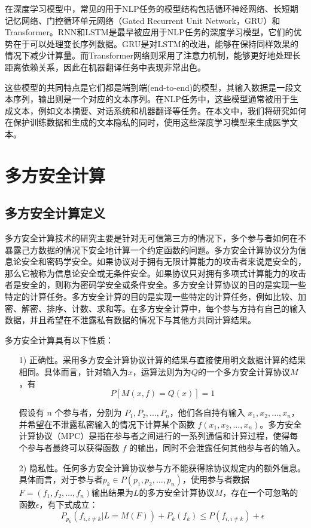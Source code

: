 在深度学习模型中，常见的用于NLP任务的模型结构包括循环神经网络、长短期记忆网络、门控循环单元网络（Gated Recurrent Unit Network，GRU）和Transformer。RNN和LSTM是最早被应用于NLP任务的深度学习模型，它们的优势在于可以处理变长序列数据。GRU是对LSTM的改进，能够在保持同样效果的情况下减少计算量。而Transformer网络则采用了注意力机制，能够更好地处理长距离依赖关系，因此在机器翻译任务中表现非常出色。

这些模型的共同特点是它们都是端到端(end-to-end)的模型，其输入数据是一段文本序列，输出则是一个对应的文本序列。在NLP任务中，这些模型通常被用于生成文本，例如文本摘要、对话系统和机器翻译等任务。在本文中，我们将研究如何在保护训练数据和生成的文本隐私的同时，使用这些深度学习模型来生成医学文本。

\section{多方安全计算}


\subsection{多方安全计算定义}

多方安全计算技术的研究主要是针对无可信第三方的情况下，多个参与者如何在不暴露己方数据的情况下安全地计算一个约定函数的问题。多方安全计算协议分为信息论安全和密码学安全。如果协议对于拥有无限计算能力的攻击者来说是安全的，那么它被称为信息论安全或无条件安全。如果协议只对拥有多项式计算能力的攻击者是安全的，则称为密码学安全或条件安全。多方安全计算协议的目的是实现一些特定的计算任务。多方安全计算的目的是实现一些特定的计算任务，例如比较、加密、解密、排序、计数、求和等。在多方安全计算中，每个参与方持有自己的输入数据，并且希望在不泄露私有数据的情况下与其他方共同计算结果。

多方安全计算具有以下性质：

\begin{itemize}
	\item [1)]
	正确性。采用多方安全计算协议计算的结果与直接使用明文数据计算的结果相同。具体而言，针对输入为$x$，运算法则为为$Q$的一个多方安全计算协议$M$，有
	$$P[M(x,f)=Q(x)]=1$$
	
	假设有 $n$ 个参与者，分别为 $P_1, P_2, ..., P_n$，他们各自持有输入 $x_1, x_2, ..., x_n$，并希望在不泄露私密输入的情况下计算某个函数 $f(x_1, x_2, ..., x_n)$。多方安全计算协议（MPC）是指在参与者之间进行的一系列通信和计算过程，使得每个参与者最终可以获得函数 $f$ 的输出，同时不会泄露任何其他参与者的输入。
	\item [2)]
	隐私性。任何多方安全计算协议参与方不能获得除协议规定内的额外信息。具体而言，对于参与者$p_k\in P(p_1, p_2, \dots, p_n)$，使用参与者数据$F=(f_1, f_2, \dots, f_n)$输出结果为$L$的多方安全计算协议$M$，存在一个可忽略的函数$\epsilon$，有下式成立：
	$$P_{p_k}(f_{i,i\neq k}|L=M(F))+P_k(f_k)\leq P(f_{i,i\neq k})+\epsilon$$
	
\end{itemize}


